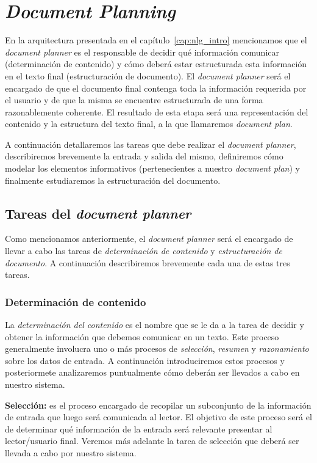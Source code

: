 \chapter{\textit{Document Planning}}
\label{cap:document_planning}

En la arquitectura presentada en el capítulo~\ref{cap:nlg_intro} mencionamos que el \emph{document planner} es el responsable de decidir qué información comunicar (determinación de contenido) y cómo deberá estar estructurada esta información en el texto final (estructuración de documento). El \textit{document planner} será el encargado de que el documento final contenga toda la información requerida por el usuario y de que la misma se encuentre estructurada de una forma razonablemente coherente. El resultado de esta etapa será una representación del contenido y la estructura del texto final, a la que llamaremos \emph{document plan}.

A continuación detallaremos las tareas que debe realizar el \textit{document planner}, describiremos brevemente la entrada y salida del mismo, definiremos cómo modelar los elementos informativos (pertenecientes a nuestro \emph{document plan}) y finalmente estudiaremos la estructuración del documento.

\section{Tareas del \textit{document planner}}
Como mencionamos anteriormente, el \textit{document planner} será el encargado de llevar a cabo las tareas de \emph{determinación de contenido} y \emph{estructuración de documento}. A continuación describiremos brevemente cada una de estas tres tareas.

\subsection*{Determinación de contenido}

La \emph{determinación del contenido} es el nombre que se le da a la tarea de decidir y obtener la información que debemos comunicar en un texto. Este proceso generalmente involucra uno o más procesos de \emph{selección}, \emph{resumen} y \emph{razonamiento} sobre los datos de entrada. A continuación introduciremos estos procesos y posteriormete analizaremos puntualmente cómo deberán ser llevados a cabo en nuestro sistema.

\bigskip
\noindent
\textbf{Selección:} es el proceso encargado de recopilar un subconjunto de la información de entrada que luego será comunicada al lector. El objetivo de este proceso será el de determinar qué información de la entrada será relevante presentar al lector/usuario final. Veremos más adelante la tarea de selección que deberá ser llevada a cabo por nuestro sistema.

